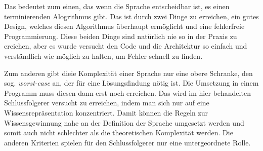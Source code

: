 Das bedeutet zum einen, das wenn die Sprache entscheidbar ist, es einen terminierenden Alogrithmus gibt. Das ist durch zwei Dinge zu erreichen, ein gutes Design, welches diesen Algorithmus überhaupt ermöglicht und eine fehlerfreie Programmierung. Diese beiden Dinge sind natürlich nie so in der Praxis zu ereichen, aber es wurde versucht den Code und die Architektur so einfach und verständlich wie möglich zu halten, um Fehler schnell zu finden.

Zum anderen gibt dieie Komplexität einer Sprache nur eine obere Schranke, den sog. \emph{worst-case} an, der für eine Lösungsfindung nötig ist. Die Umsetzung in einem Programm muss diesen dann erst noch erreichen. Das wird im hier behandelten Schlussfolgerer versucht zu erreichen, indem man sich nur auf eine Wissensrepräsentation konzentriert. Damit können die Regeln zur Wissensgewinnung nahe an der Definition der Sprache umgesetzt werden und somit auch nicht schlechter als die theoretischen Komplexität werden.
Die anderen Kriterien spielen für den Schlussfolgerer nur eine untergeordnete Rolle.



